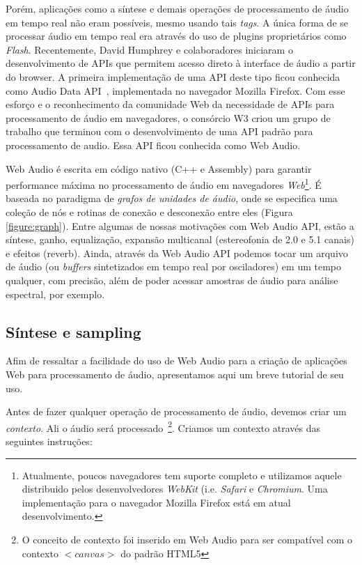 \documentclass
  [ams,pdfout]%
        {aesbr}
\begin{document}
Porém, aplicações como a síntese e demais operações de processamento
de áudio em tempo real não eram possíveis, mesmo usando tais
\emph{tags}. A única forma de se processar áudio em tempo real era
através do uso de plugins proprietários como
\emph{Flash}. Recentemente, David Humphrey e colaboradores iniciaram o
desenvolvimento de APIs que permitem acesso direto à interface de
áudio a partir do browser. A primeira implementação de uma API deste
tipo ficou conhecida como Audio Data API~\cite{audiodata},
implementada no navegador Mozilla Firefox. Com esse esforço e o
reconhecimento da comunidade Web da necessidade de APIs para
processamento de áudio em navegadores, o consórcio W3 criou um grupo
de trabalho que terminou com o desenvolvimento de uma API padrão para
processamento de audio. Essa API ficou conhecida como Web Audio.

Web Audio é escrita em código nativo (C++ e Assembly) para garantir
performance máxima no processamento de áudio em navegadores
\emph{Web}\footnote{Atualmente, poucos navegadores tem suporte
  completo e utilizamos aquele distribuido pelos desenvolvedores
  \emph{WebKit} (i.e. \emph{Safari} e \emph{Chromium}. Uma
  implementação para o navegador Mozilla Firefox está em atual
  desenvolvimento.}. É baseada no paradigma de \emph{grafos de
  unidades de áudio}, onde se especifica uma coleção de nós e rotinas
de conexão e desconexão entre eles (Figura \ref{figure:graph}). Entre
algumas de nossas motivações com Web Audio API, estão a síntese,
ganho, equalização, expansão multicanal (estereofonia de 2.0 e 5.1
canais) e efeitos (reverb). Ainda, através da Web Audio API podemos
tocar um arquivo de áudio (ou \emph{buffers} sintetizados em tempo
real por osciladores) em um tempo qualquer, com precisão, além de
poder acessar amostras de áudio para análise espectral, por exemplo.

\subsection{Síntese e sampling}

Afim de ressaltar a facilidade do uso de Web Audio para a criação de
aplicações Web para processamento de áudio, apresentamos aqui um breve
tutorial de seu uso.

Antes de fazer qualquer operação de processamento de áudio, devemos
criar um \emph{contexto}. Ali o áudio será processado~\footnote{O
  conceito de contexto foi inserido em Web Audio para ser compatível
  com o contexto $<canvas>$ do padrão HTML5}. Criamos um contexto
através das seguintes instruções:
\end{document}

